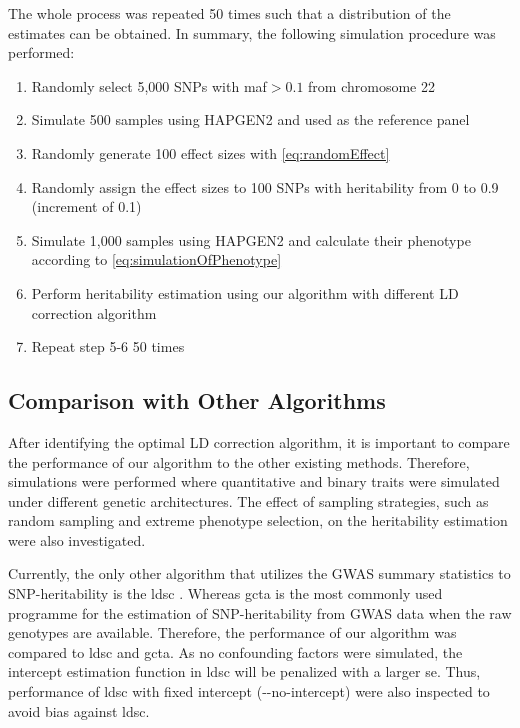 		The whole process was repeated 50 times such that a distribution of the estimates can be obtained. 
		In summary, the following simulation procedure was performed:
		\begin{enumerate}
			\item Randomly select 5,000 \glspl{SNP} with \gls{maf}$>0.1$ from chromosome 22
			\item Simulate 500 samples using HAPGEN2 and used as the reference panel
			\item Randomly generate 100 effect sizes with \cref{eq:randomEffect}
			\item Randomly assign the effect sizes to 100 \glspl{SNP} with heritability from 0 to 0.9 (increment of 0.1)
			\item Simulate 1,000 samples using HAPGEN2 and calculate their phenotype according to \cref{eq:simulationOfPhenotype} 
			\item Perform heritability estimation using our algorithm with different \gls{LD} correction algorithm
			\item Repeat step 5-6 50 times
		\end{enumerate}
		
		\subsection{Comparison with Other Algorithms}
		After identifying the optimal \gls{LD} correction algorithm, it is important to compare the performance of our algorithm to the other existing methods.
		Therefore, simulations were performed where quantitative and binary traits were simulated under different genetic architectures. 
		The effect of sampling strategies, such as random sampling and extreme phenotype selection, on the heritability estimation were also investigated.
		
		Currently, the only other algorithm that utilizes the \gls{GWAS} summary statistics to \gls{SNP}-heritability is the \gls{ldsc} \citep{Bulik-Sullivan2015}.
		Whereas \gls{gcta} \citep{Yang2011} is the most commonly used programme for the estimation of \gls{SNP}-heritability from \gls{GWAS} data when the raw genotypes are available. 
		Therefore, the performance of our algorithm was compared to \gls{ldsc} and \gls{gcta}.
		As no confounding factors were simulated, the intercept estimation function in \gls{ldsc} will be penalized with a larger \gls{se}. 
		Thus, performance of \gls{ldsc} with fixed intercept (-{}-no-intercept) were also inspected to avoid bias against \gls{ldsc}.
		
